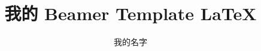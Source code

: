 

%
%
\title{我的 Beamer Template \LaTeX}

%
%
\author{我的名字}

%
%

%
%
\date


%
%


\usepackage{geometry}
\usepackage{fancyhdr}
\usepackage{ctex}
\usepackage{graphicx}
\usepackage{subfigure}
\usepackage[english]{babel}
\usepackage{mathptmx}
\usepackage{amsthm}
\usepackage[T1]{fontenc}
\usepackage{float}
\usepackage[ruled,linesnumbered]{algorithm2e}

\graphicspath{{figures/}}